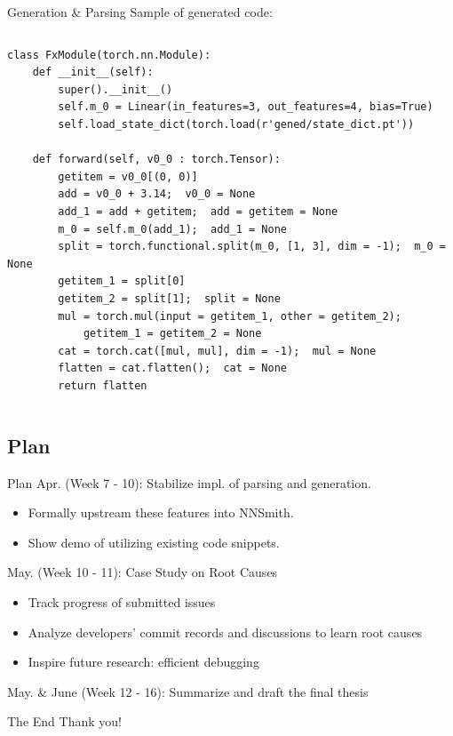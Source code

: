 \documentclass{beamer}
\begin{document}
\begin{frame}[fragile]{Generation \& Parsing}
    Sample of generated code:
    \begin{columns}
        \begin{verbatim}
class FxModule(torch.nn.Module):
    def __init__(self):
        super().__init__()
        self.m_0 = Linear(in_features=3, out_features=4, bias=True)
        self.load_state_dict(torch.load(r'gened/state_dict.pt'))

    def forward(self, v0_0 : torch.Tensor):
        getitem = v0_0[(0, 0)]
        add = v0_0 + 3.14;  v0_0 = None
        add_1 = add + getitem;  add = getitem = None
        m_0 = self.m_0(add_1);  add_1 = None
        split = torch.functional.split(m_0, [1, 3], dim = -1);  m_0 = None
        getitem_1 = split[0]
        getitem_2 = split[1];  split = None
        mul = torch.mul(input = getitem_1, other = getitem_2);
            getitem_1 = getitem_2 = None
        cat = torch.cat([mul, mul], dim = -1);  mul = None
        flatten = cat.flatten();  cat = None
        return flatten
    \end{verbatim}
    \end{columns}
\end{frame}

\subsection{Plan}
\begin{frame}{Plan}
    Apr. (Week 7 - 10): Stabilize impl. of parsing and generation.
    \begin{itemize}
        \item Formally upstream these features into NNSmith.
        \item Show demo of utilizing existing code snippets.
    \end{itemize}
    May. (Week 10 - 11): Case Study on Root Causes
    \begin{itemize}
        \item Track progress of submitted issues
        \item Analyze developers' commit records and discussions to learn root causes
        \item Inspire future research: efficient debugging
    \end{itemize}
    May. \& June (Week 12 - 16): Summarize and draft the final thesis
\end{frame}

\begin{frame}{The End}
    Thank you!    
\end{frame}

\end{document}
